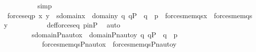 \begin{isabellebody}
\ \ \ \ \ \ \ \ \isamarkupfalse%
\ simp\ \isanewline
\ \ \ \ \ \ \ \ \isamarkupfalse%
\ \isanewline
\isanewline
\ \ \ \ \ \ \isamarkupfalse%
\ {\isachardoublequoteopen}forces{\isacharunderscore}{\kern0pt}eq{\isacharparenleft}{\kern0pt}p{\isacharcomma}{\kern0pt}\ x{\isacharcomma}{\kern0pt}\ y{\isacharparenright}{\kern0pt}\ {\isasymlongleftrightarrow}\ {\isacharparenleft}{\kern0pt}{\isasymforall}s{\isasymin}domain{\isacharparenleft}{\kern0pt}x{\isacharparenright}{\kern0pt}\ {\isasymunion}\ domain{\isacharparenleft}{\kern0pt}y{\isacharparenright}{\kern0pt}{\isachardot}{\kern0pt}\ {\isasymforall}q{\isachardot}{\kern0pt}\ q{\isasymin}P\ {\isasymand}\ q\ {\isasympreceq}\ p\ {\isasymlongrightarrow}\ {\isacharparenleft}{\kern0pt}forces{\isacharunderscore}{\kern0pt}mem{\isacharparenleft}{\kern0pt}q{\isacharcomma}{\kern0pt}s{\isacharcomma}{\kern0pt}x{\isacharparenright}{\kern0pt}\ {\isasymlongleftrightarrow}\ forces{\isacharunderscore}{\kern0pt}mem{\isacharparenleft}{\kern0pt}q{\isacharcomma}{\kern0pt}s{\isacharcomma}{\kern0pt}y{\isacharparenright}{\kern0pt}{\isacharparenright}{\kern0pt}{\isacharparenright}{\kern0pt}{\isachardoublequoteclose}\ \isanewline
\ \ \ \ \ \ \ \ \isamarkupfalse%
\ def{\isacharunderscore}{\kern0pt}forces{\isacharunderscore}{\kern0pt}eq\ pinP\ \isamarkupfalse%
\ auto\isanewline
\ \ \ \ \ \ \isamarkupfalse%
\ \isamarkupfalse%
\ {\isachardoublequoteopen}{\isachardot}{\kern0pt}{\isachardot}{\kern0pt}{\isachardot}{\kern0pt}\ {\isasymlongleftrightarrow}\ \isanewline
\ \ \ \ \ \ \ \ {\isacharparenleft}{\kern0pt}{\isasymforall}s{\isasymin}domain{\isacharparenleft}{\kern0pt}Pn{\isacharunderscore}{\kern0pt}auto{\isacharparenleft}{\kern0pt}{\isasympi}{\isacharparenright}{\kern0pt}{\isacharbackquote}{\kern0pt}x{\isacharparenright}{\kern0pt}\ {\isasymunion}\ domain{\isacharparenleft}{\kern0pt}Pn{\isacharunderscore}{\kern0pt}auto{\isacharparenleft}{\kern0pt}{\isasympi}{\isacharparenright}{\kern0pt}{\isacharbackquote}{\kern0pt}y{\isacharparenright}{\kern0pt}{\isachardot}{\kern0pt}\ {\isasymforall}q{\isachardot}{\kern0pt}\ q{\isasymin}P\ {\isasymand}\ q\ {\isasympreceq}\ {\isasympi}{\isacharbackquote}{\kern0pt}p\ \isanewline
\ \ \ \ \ \ \ \ \ \ {\isasymlongrightarrow}\ {\isacharparenleft}{\kern0pt}forces{\isacharunderscore}{\kern0pt}mem{\isacharparenleft}{\kern0pt}q{\isacharcomma}{\kern0pt}s{\isacharcomma}{\kern0pt}Pn{\isacharunderscore}{\kern0pt}auto{\isacharparenleft}{\kern0pt}{\isasympi}{\isacharparenright}{\kern0pt}{\isacharbackquote}{\kern0pt}x{\isacharparenright}{\kern0pt}\ {\isasymlongleftrightarrow}\ forces{\isacharunderscore}{\kern0pt}mem{\isacharparenleft}{\kern0pt}q{\isacharcomma}{\kern0pt}s{\isacharcomma}{\kern0pt}Pn{\isacharunderscore}{\kern0pt}auto{\isacharparenleft}{\kern0pt}{\isasympi}{\isacharparenright}{\kern0pt}{\isacharbackquote}{\kern0pt}y{\isacharparenright}{\kern0pt}{\isacharparenright}{\kern0pt}{\isacharparenright}{\kern0pt}{\isachardoublequoteclose}\ \isanewline

\end{isabellebody}
